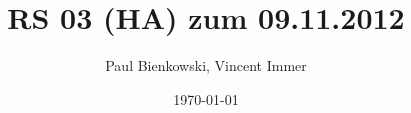 \documentclass[a4paper,10pt]{scrartcl}
\author{Paul Bienkowski, Vincent Immer}
\title{RS 03 (HA) zum 09.11.2012}
\date{\today}
\begin{document}
\setcounter{secnumdepth}{0}
\maketitle

\newlength{\digitwidth}
\newcommand\wmrule[2]{\noalign{\moveright#1\digitwidth\vbox{\hrule width#2\digitwidth\vspace{1pt}}}}
\newenvironment{wmcalc}
  {\vspace{0.6em}\begin{center}\settowidth\digitwidth{0}\setlength{\tabcolsep}{\digitwidth}\def~{\hspace{\digitwidth}}\begin{tabular}{r@{}}}
  {\end{tabular}\end{center}\vspace{0.6em}}
\end{document}

